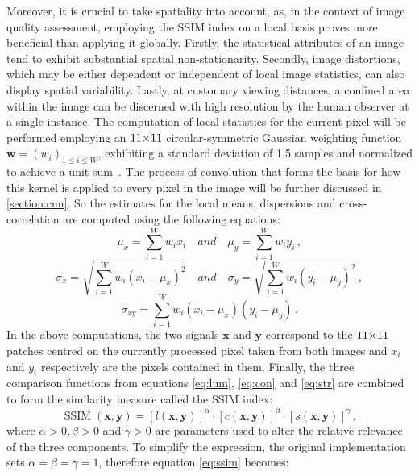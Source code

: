 Moreover, it is crucial to take spatiality into account, as, in the context of image quality assessment, employing the SSIM index on a local basis proves more beneficial than applying it globally. Firstly, the statistical attributes of an image tend to exhibit substantial spatial non-stationarity. Secondly, image distortions, which may be either dependent or independent of local image statistics, can also display spatial variability. Lastly, at customary viewing distances, a confined area within the image can be discerned with high resolution by the human observer at a single instance. The computation of local statistics for the current pixel will be performed employing an $11 {\times} 11$ circular-symmetric Gaussian weighting function $\symbf{w} = (w_i)_{1 \leq i \leq W}$, exhibiting a standard deviation of 1.5 samples and normalized to achieve a unit sum~\supercite{ssim}. The process of convolution that forms the basis for how this kernel is applied to every pixel in the image will be further discussed in \autoref{section:cnn}. So the estimates for the local means, dispersions and cross-correlation are computed using the following equations:
\begin{equation}
    \mu_x = \sum\limits_{i=1}^W w_i x_i \quad and \quad \mu_y = \sum\limits_{i = 1}^W w_i y_i\,,
\end{equation}
\begin{equation}
    \sigma_x = \sqrt{ \sum\limits_{i=1}^W w_i (x_i - \mu_x)^2} \quad and \quad \sigma_y = \sqrt{ \sum\limits_{i=1}^W w_i (y_i - \mu_y)^2 }\,,
\end{equation}
\begin{equation}
    \sigma_{xy} = \sum\limits_{i=1}^W w_i (x_i - \mu_x) (y_i - \mu_y)\,.
\end{equation}
In the above computations, the two signals $\symbf{x}$ and $\symbf{y}$ correspond to the $11 {\times} 11$ patches centred on the currently processed pixel taken from both images and $x_i$ and $y_i$ respectively are the pixels contained in them.  Finally, the three comparison functions from equations \eqref{eq:lum}, \eqref{eq:con} and \eqref{eq:str} are combined to form the similarity measure called the SSIM index:
\begin{equation}
    \operatorname{SSIM}(\symbf{x}, \symbf{y}) = \left[ l(\symbf{x}, \symbf{y}) \right] ^ \alpha \cdot \left[ c(\symbf{x}, \symbf{y}) \right] ^ \beta \cdot \left[ s(\symbf{x}, \symbf{y}) \right] ^ \gamma \,,\label{eq:ssim}
\end{equation}
where $\alpha > 0, \beta > 0$ and $\gamma > 0$ are parameters used to alter the relative relevance of the three components. To simplify the expression, the original implementation sets $\alpha = \beta = \gamma = 1$, therefore equation \eqref{eq:ssim} becomes:
